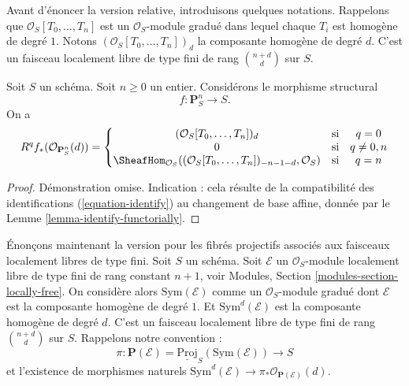 \noindent
Avant d'énoncer la version relative, introduisons quelques notations.
Rappelons que $\mathcal{O}_S[T_0, \ldots, T_n]$ est un
$\mathcal{O}_S$-module gradué dans lequel chaque $T_i$ est homogène de degré $1$.
Notons $(\mathcal{O}_S[T_0, \ldots, T_n])_d$ la composante homogène de degré $d$.
C'est un faisceau localement libre de type fini de rang $\binom{n + d}{d}$ sur $S$.

\begin{lemma}
\label{lemma-cohomology-projective-space-over-base}
Soit $S$ un schéma.
Soit $n \geq 0$ un entier.
Considérons le morphisme structural
$$
f : \mathbf{P}^n_S \longrightarrow S.
$$
On a
$$
R^qf_*(\mathcal{O}_{\mathbf{P}^n_S}(d)) =
\left\{
\begin{matrix}
(\mathcal{O}_S[T_0, \ldots, T_n])_d & \text{si} & q = 0 \\
0 & \text{si} & q \not = 0, n \\
\SheafHom_{\mathcal{O}_S}(
(\mathcal{O}_S[T_0, \ldots, T_n])_{- n - 1 - d}, \mathcal{O}_S)
& \text{si} & q = n
\end{matrix}
\right.
$$
\end{lemma}

\begin{proof}
Démonstration omise. Indication : cela résulte de la compatibilité des identifications
(\ref{equation-identify}) au changement de base affine,
donnée par le Lemme \ref{lemma-identify-functorially}.
\end{proof}

\noindent
Énonçons maintenant la version pour les fibrés projectifs associés aux faisceaux
localement libres de type fini. Soit $S$ un schéma. Soit $\mathcal{E}$ un
$\mathcal{O}_S$-module localement libre de type fini de rang constant $n + 1$, voir
Modules, Section \ref{modules-section-locally-free}.
On considère alors $\text{Sym}(\mathcal{E})$ comme un
$\mathcal{O}_S$-module gradué dont $\mathcal{E}$ est la composante homogène de degré $1$.
Et $\text{Sym}^d(\mathcal{E})$ est la composante homogène de degré $d$.
C'est un faisceau localement libre de type fini de rang $\binom{n + d}{d}$ sur $S$.
Rappelons notre convention :
$$
\pi :
\mathbf{P}(\mathcal{E})
=
\underline{\text{Proj}}_S(\text{Sym}(\mathcal{E}))
\longrightarrow
S
$$
et l'existence de morphismes naturels
$\text{Sym}^d(\mathcal{E}) \to \pi_*\mathcal{O}_{\mathbf{P}(\mathcal{E})}(d)$.

